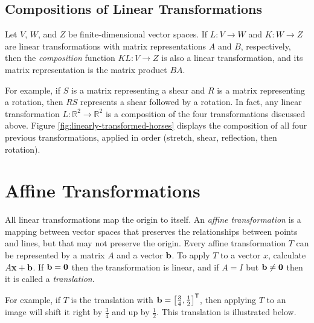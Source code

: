 \subsection*{Compositions of Linear Transformations} %

Let $V$, $W$, and $Z$ be finite-dimensional vector spaces.
If $L:V\rightarrow W$ and $K:W\rightarrow Z$ are linear transformations with matrix representations $A$ and $B$, respectively, then the \emph{composition} function $KL:V\rightarrow Z$ is also a linear transformation, and its matrix representation is the matrix product $BA$.

For example, if $S$ is a matrix representing a shear and $R$ is a matrix representing a rotation, then $RS$ represents a shear followed by a rotation.
In fact, any linear transformation $L:\mathbb{R}^2 \rightarrow\mathbb{R}^2$ is a composition of the four transformations discussed above.
Figure \ref{fig:linearly-transformed-horses} displays the composition of all four previous transformations, applied in order (stretch, shear, reflection, then rotation).

\section*{Affine Transformations} %

All linear transformations map the origin to itself.
An \emph{affine transformation} is a mapping between vector spaces that preserves the relationships between points and lines, but that may not preserve the origin.
Every affine transformation $T$ can be represented by a matrix $A$ and a vector $\mathbf{b}$.
To apply $T$ to a vector $x$, calculate $A\mathbf{x} + \mathbf{b}$.
If $\mathbf{b} = \mathbf{0}$ then the transformation is linear, and if $A = I$ but $\mathbf{b}\neq\mathbf{0}$ then it is called a \emph{translation}.

For example, if $T$ is the translation with $\mathbf{b} = \left[\frac{3}{4}, \frac{1}{2}\right]^{\mathsf T}$, then applying $T$ to an image will shift it right by $\frac{3}{4}$ and up by $\frac{1}{2}$.
This translation is illustrated below.

